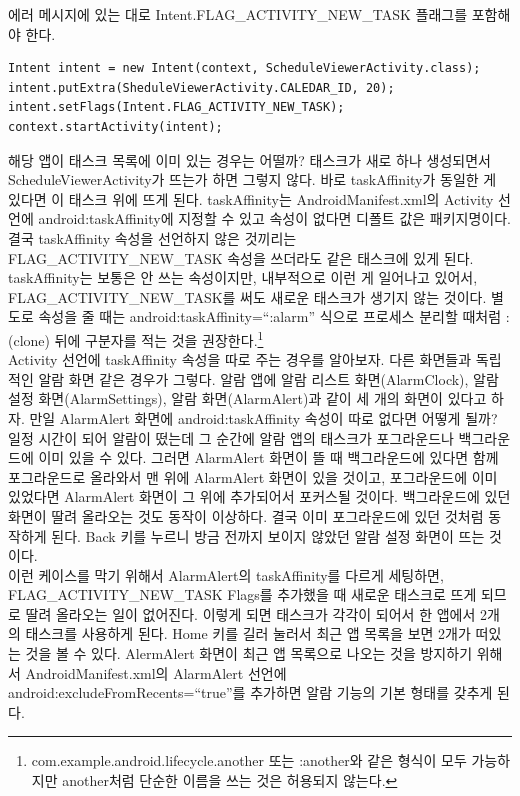 에러 메시지에 있는 대로 Intent.FLAG\_ACTIVITY\_NEW\_TASK 플래그를 포함해야 한다.
\begin{lstlisting}[frame=single]
Intent intent = new Intent(context, ScheduleViewerActivity.class);
intent.putExtra(SheduleViewerActivity.CALEDAR_ID, 20);
intent.setFlags(Intent.FLAG_ACTIVITY_NEW_TASK);
context.startActivity(intent);
\end{lstlisting}

해당 앱이 태스크 목록에 이미 있는 경우는 어떨까? 태스크가 새로 하나 생성되면서 ScheduleViewerActivity가 뜨는가 하면 그렇지 않다. 바로 taskAffinity가 동일한 게 있다면 이 태스크 위에 뜨게 된다. 
taskAffinity는 AndroidManifest.xml의 Activity 선언에 android:taskAffinity에 지정할 수 있고 속성이 없다면 디폴트 값은 패키지명이다.
결국 taskAffinity 속성을 선언하지 않은 것끼리는 FLAG\_ACTIVITY\_NEW\_TASK 속성을 쓰더라도 같은 태스크에 있게 된다.
taskAffinity는 보통은 안 쓰는 속성이지만, 내부적으로 이런 게 일어나고 있어서, FLAG\_ACTIVITY\_NEW\_TASK를 써도 새로운 태스크가 생기지 않는 것이다.
별도로 속성을 줄 때는 android:taskAffinity=``:alarm'' 식으로 프로세스 분리할 때처럼 :(clone) 뒤에 구분자를 적는 것을 권장한다.\footnote{com.example.android.lifecycle.another 또는 :another와 같은 형식이 모두 가능하지만  another처럼 단순한 이름을 쓰는 것은 허용되지 않는다.}\\

Activity 선언에 taskAffinity 속성을 따로 주는 경우를 알아보자. 다른 화면들과 독립적인 알람 화면 같은 경우가 그렇다. 
알람 앱에 알람 리스트 화면(AlarmClock), 알람 설정 화면(AlarmSettings), 알람 화면(AlarmAlert)과 같이 세 개의 화면이 있다고 하자. 
만일 AlarmAlert 화면에 android:taskAffinity 속성이 따로 없다면 어떻게 될까?
일정 시간이 되어 알람이 떴는데 그 순간에 알람 앱의 태스크가 포그라운드나 백그라운드에 이미 있을 수 있다. 
그러면 AlarmAlert 화면이 뜰 때 백그라운드에 있다면 함께 포그라운드로 올라와서 맨 위에 AlarmAlert 화면이 있을 것이고, 포그라운드에 이미 있었다면 AlarmAlert 화면이 그 위에 추가되어서 포커스될 것이다.
백그라운드에 있던 화면이 딸려 올라오는 것도 동작이 이상하다. 결국 이미 포그라운드에 있던 것처럼 동작하게 된다. Back 키를 누르니 방금 전까지 보이지 않았던 알람 설정 화면이 뜨는 것이다.\\

이런 케이스를 막기 위해서 AlarmAlert의 taskAffinity를 다르게 세팅하면, FLAG\_ACTIVITY\_NEW\_TASK Flags를 추가했을 때 새로운 태스크로 뜨게 되므로 딸려 올라오는 일이 없어진다. 이렇게 되면 태스크가 각각이 되어서 한 앱에서 2개의 태스크를 사용하게 된다.
Home 키를 길러 눌러서 최근 앱 목록을 보면 2개가 떠있는 것을 볼 수 있다. AlermAlert 화면이 최근 앱 목록으로 나오는 것을 방지하기 위해서 AndroidManifest.xml의 AlarmAlert 선언에 android:excludeFromRecents=``true''를 추가하면 알람 기능의 기본 형태를 갖추게 된다.


